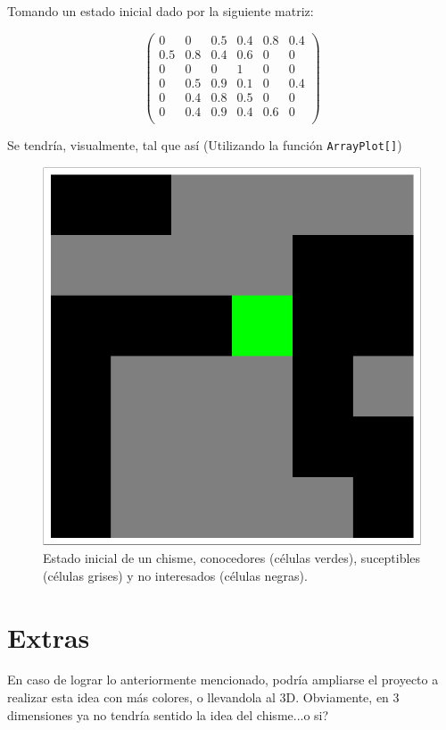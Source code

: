 Tomando un estado inicial dado por la siguiente matriz:

$$
\left(
\begin{array}{cccccc}
 0 & 0 & 0.5 & 0.4 & 0.8 & 0.4 \\
 0.5 & 0.8 & 0.4 & 0.6 & 0 & 0 \\
 0 & 0 & 0 & 1 & 0 & 0 \\
 0 & 0.5 & 0.9 & 0.1 & 0 & 0.4 \\
 0 & 0.4 & 0.8 & 0.5 & 0 & 0 \\
 0 & 0.4 & 0.9 & 0.4 & 0.6 & 0 \\
\end{array}
\right)
$$

Se tendría, visualmente, tal que así (Utilizando la función \texttt{ArrayPlot[]})

\begin{figure}[H]
	\centering
	\includegraphics[scale=0.5]{./img/array.pdf}
	\caption{Estado inicial de un chisme, conocedores (células verdes), suceptibles (células grises) y no interesados (células negras).}
\end{figure}




\section*{Extras}
En caso de lograr lo anteriormente mencionado, podría ampliarse el proyecto a realizar esta idea con más colores, o llevandola al 3D. Obviamente, en 3 dimensiones ya no tendría sentido la idea del chisme...o si?


